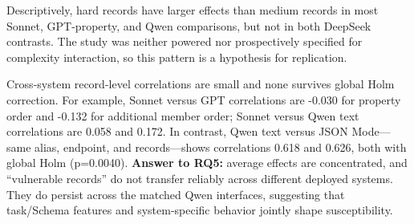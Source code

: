 \documentclass[11pt,a4paper]{article}
\begin{document}
\begin{table}[t]
\caption{Post-hoc effect-concentration stress tests.}
\label{tab:markdown-5}
\centering
{}
\end{table}
Descriptively, hard records have larger effects than medium records in most Sonnet, GPT-property, and Qwen comparisons, but not in both DeepSeek contrasts. The study was neither powered nor prospectively specified for complexity interaction, so this pattern is a hypothesis for replication.

Cross-system record-level correlations are small and none survives global Holm correction. For example, Sonnet versus GPT correlations are -0.030 for property order and -0.132 for additional member order; Sonnet versus Qwen text correlations are 0.058 and 0.172. In contrast, Qwen text versus JSON Mode---same alias, endpoint, and records---shows correlations 0.618 and 0.626, both with global Holm (p=0.0040). \textbf{Answer to RQ5:} average effects are concentrated, and ``vulnerable records'' do not transfer reliably across different deployed systems. They do persist across the matched Qwen interfaces, suggesting that task/Schema features and system-specific behavior jointly shape susceptibility.
\end{document}
